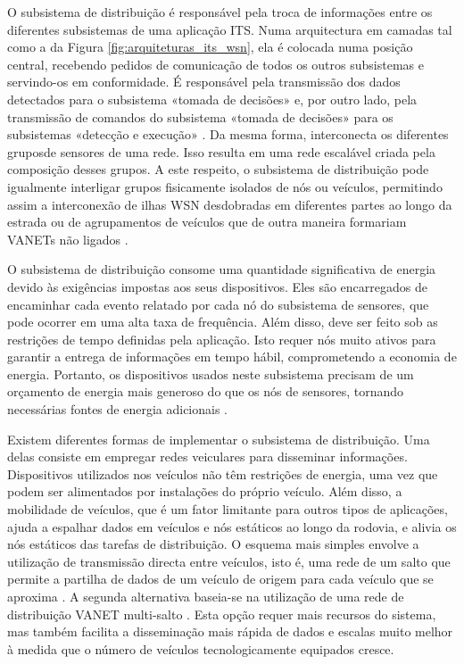 \documentclass[
	12pt,				%
	oneside,			%
	a4paper,			%
	english,			%
	brazil				%
	]{abntex2ppgsi}
\begin{document}
O subsistema de distribuição é responsável pela troca de informações entre os diferentes subsistemas de uma aplicação ITS. Numa arquitectura em camadas tal como a da Figura \ref{fig:arquiteturas_its_wsn}, ela é colocada numa posição central, recebendo pedidos de comunicação de todos os outros subsistemas e servindo-os em conformidade. É responsável pela transmissão dos dados detectados para o subsistema «tomada de decisões» e, por outro lado, pela transmissão de comandos do subsistema «tomada de decisões» para os subsistemas «detecção e execução» \cite{sung2007collision}. Da mesma forma, interconecta os diferentes gruposde sensores de uma rede. Isso resulta em uma rede escalável criada pela composição desses grupos. A este respeito, o subsistema de distribuição pode igualmente interligar grupos fisicamente isolados de nós ou veículos, permitindo assim a interconexão de ilhas WSN desdobradas em diferentes partes ao longo da estrada \cite{weingartner2007prototype} ou de agrupamentos de veículos que de outra maneira formariam VANETs não ligados \cite{tripp2010performance} .

O subsistema de distribuição consome uma quantidade significativa de energia devido às exigências impostas aos seus dispositivos. Eles são encarregados de encaminhar cada evento relatado por cada nó do subsistema de sensores, que pode ocorrer em uma alta taxa de frequência. Além disso, deve ser feito sob as restrições de tempo definidas pela aplicação. Isto requer nós muito ativos para garantir a entrega de informações em tempo hábil, comprometendo a economia de energia. Portanto, os dispositivos usados neste subsistema precisam de um orçamento de energia mais generoso do que os nós de sensores, tornando necessárias fontes de energia adicionais \cite{losilla2011comprehensive}.

Existem diferentes formas de implementar o subsistema de distribuição. Uma delas consiste em empregar redes veiculares para disseminar informações. Dispositivos utilizados nos veículos não têm restrições de energia, uma vez que podem ser alimentados por instalações do próprio veículo. Além disso, a mobilidade de veículos, que é um fator limitante para outros tipos de aplicações, ajuda a espalhar dados em veículos e nós estáticos ao longo da rodovia, e alivia os nós estáticos das tarefas de distribuição. O esquema mais simples envolve a utilização de transmissão directa entre veículos, isto é, uma rede de um salto que permite a partilha de dados de um veículo de origem para cada veículo que se aproxima \cite{li2007snms} \cite{miura2006evaluation}. A segunda alternativa baseia-se na utilização de uma rede de distribuição VANET multi-salto \cite{qin2010integrated}. Esta opção requer mais recursos do sistema, mas também facilita a disseminação mais rápida de dados e escalas muito melhor à medida que o número de veículos tecnologicamente equipados cresce.
\end{document}
